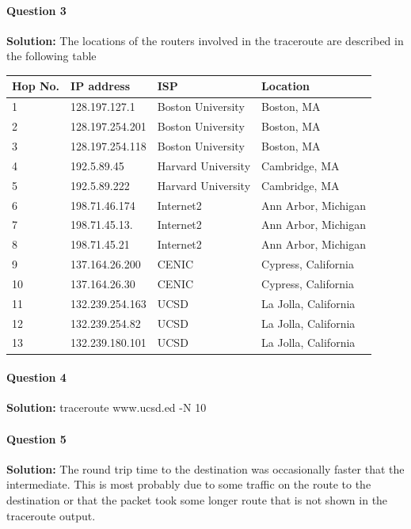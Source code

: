 \documentclass[12pt]{article}
\begin{document}
\paragraph{Question 3\\}
\textbf{Solution: }
The locations of the routers involved in the traceroute are described in the following table
\begin{center}
	\begin{tabular}{ | l | l | l | l | }
	\hline
	Hop No. & IP address & ISP & Location \\ \hline
	1  & 128.197.127.1 	& Boston University		& Boston, MA \\ \hline
	2   & 128.197.254.201 	& Boston University		& Boston, MA \\ \hline
	3   & 128.197.254.118 	& Boston University 	& Boston, MA \\ \hline
	4   & 192.5.89.45		& Harvard University 	& Cambridge, MA \\ \hline
	5   & 192.5.89.222 		& Harvard University	& Cambridge, MA \\ \hline
	6   & 198.71.46.174	& Internet2			& Ann Arbor, Michigan \\ \hline
	7   & 198.71.45.13.		& Internet2			& Ann Arbor, Michigan \\ \hline
	8   & 198.71.45.21		& Internet2			& Ann Arbor, Michigan \\ \hline
	9   & 137.164.26.200	& CENIC			& Cypress, California \\ \hline
	10 & 137.164.26.30	& CENIC			& Cypress, California \\ \hline
	11 & 132.239.254.163	& UCSD			& La Jolla, California \\ \hline
	12 & 132.239.254.82	& UCSD			& La Jolla, California \\ \hline
	13 & 132.239.180.101	& UCSD			& La Jolla, California \\ \hline
	\end{tabular}
\end{center}

\paragraph{Question 4\\}
\textbf{Solution: }
traceroute www.ucsd.ed -N 10

\paragraph{Question 5\\}
\textbf{Solution: }
The round trip time to the destination was occasionally faster that the intermediate. This is most probably due to some traffic on the route to the destination or that the packet took some longer route that is not shown in the traceroute output. 
\end{document}
